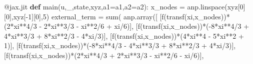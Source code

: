 \documentclass[
  11pt,
]{article}
\newenvironment{Shaded}{}{}
\newcommand{\AttributeTok}[1]{\textcolor[rgb]{0.49,0.56,0.16}{#1}}
\newcommand{\BuiltInTok}[1]{#1}
\newcommand{\DecValTok}[1]{\textcolor[rgb]{0.25,0.63,0.44}{#1}}
\newcommand{\KeywordTok}[1]{\textcolor[rgb]{0.00,0.44,0.13}{\textbf{#1}}}
\newcommand{\NormalTok}[1]{#1}
\newcommand{\OperatorTok}[1]{\textcolor[rgb]{0.40,0.40,0.40}{#1}}
\begin{document}
\begin{Shaded}
\begin{Highlighting}[]
    \AttributeTok{@jax.jit}
    \KeywordTok{def}\NormalTok{ main(u,\_,state,xyz,a1}\OperatorTok{=}\NormalTok{a1,a2}\OperatorTok{=}\NormalTok{a2):}
\NormalTok{        x\_nodes }\OperatorTok{=}\NormalTok{ anp.linspace(xyz[}\DecValTok{0}\NormalTok{][}\DecValTok{0}\NormalTok{],xyz[}\OperatorTok{{-}}\DecValTok{1}\NormalTok{][}\DecValTok{0}\NormalTok{],}\DecValTok{5}\NormalTok{)}
\NormalTok{        external\_term }\OperatorTok{=} \BuiltInTok{sum}\NormalTok{(}
\NormalTok{              anp.array([}
\NormalTok{                [f(transf(xi,x\_nodes))}\OperatorTok{*}\NormalTok{(}\DecValTok{2}\OperatorTok{*}\NormalTok{xi}\OperatorTok{**}\DecValTok{4}\OperatorTok{/}\DecValTok{3} \OperatorTok{{-}} \DecValTok{2}\OperatorTok{*}\NormalTok{xi}\OperatorTok{**}\DecValTok{3}\OperatorTok{/}\DecValTok{3} \OperatorTok{{-}}\NormalTok{ xi}\OperatorTok{**}\DecValTok{2}\OperatorTok{/}\DecValTok{6} \OperatorTok{+}\NormalTok{ xi}\OperatorTok{/}\DecValTok{6}\NormalTok{)],}
\NormalTok{                [f(transf(xi,x\_nodes))}\OperatorTok{*}\NormalTok{(}\OperatorTok{{-}}\DecValTok{8}\OperatorTok{*}\NormalTok{xi}\OperatorTok{**}\DecValTok{4}\OperatorTok{/}\DecValTok{3} \OperatorTok{+} \DecValTok{4}\OperatorTok{*}\NormalTok{xi}\OperatorTok{**}\DecValTok{3}\OperatorTok{/}\DecValTok{3} \OperatorTok{+} \DecValTok{8}\OperatorTok{*}\NormalTok{xi}\OperatorTok{**}\DecValTok{2}\OperatorTok{/}\DecValTok{3} \OperatorTok{{-}} \DecValTok{4}\OperatorTok{*}\NormalTok{xi}\OperatorTok{/}\DecValTok{3}\NormalTok{)],}
\NormalTok{                [f(transf(xi,x\_nodes))}\OperatorTok{*}\NormalTok{(}\DecValTok{4}\OperatorTok{*}\NormalTok{xi}\OperatorTok{**}\DecValTok{4} \OperatorTok{{-}} \DecValTok{5}\OperatorTok{*}\NormalTok{xi}\OperatorTok{**}\DecValTok{2} \OperatorTok{+} \DecValTok{1}\NormalTok{)],}
\NormalTok{                [f(transf(xi,x\_nodes))}\OperatorTok{*}\NormalTok{(}\OperatorTok{{-}}\DecValTok{8}\OperatorTok{*}\NormalTok{xi}\OperatorTok{**}\DecValTok{4}\OperatorTok{/}\DecValTok{3} \OperatorTok{{-}} \DecValTok{4}\OperatorTok{*}\NormalTok{xi}\OperatorTok{**}\DecValTok{3}\OperatorTok{/}\DecValTok{3} \OperatorTok{+} \DecValTok{8}\OperatorTok{*}\NormalTok{xi}\OperatorTok{**}\DecValTok{2}\OperatorTok{/}\DecValTok{3} \OperatorTok{+} \DecValTok{4}\OperatorTok{*}\NormalTok{xi}\OperatorTok{/}\DecValTok{3}\NormalTok{)],}
\NormalTok{                [f(transf(xi,x\_nodes))}\OperatorTok{*}\NormalTok{(}\DecValTok{2}\OperatorTok{*}\NormalTok{xi}\OperatorTok{**}\DecValTok{4}\OperatorTok{/}\DecValTok{3} \OperatorTok{+} \DecValTok{2}\OperatorTok{*}\NormalTok{xi}\OperatorTok{**}\DecValTok{3}\OperatorTok{/}\DecValTok{3} \OperatorTok{{-}}\NormalTok{ xi}\OperatorTok{**}\DecValTok{2}\OperatorTok{/}\DecValTok{6} \OperatorTok{{-}}\NormalTok{ xi}\OperatorTok{/}\DecValTok{6}\NormalTok{)],}

\end{Highlighting}
\end{Shaded}
\end{document}
